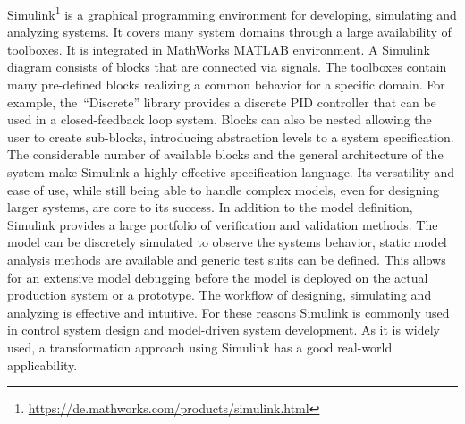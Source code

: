 Simulink\footnote{\url{https://de.mathworks.com/products/simulink.html}} is a graphical programming environment for developing, simulating and analyzing systems.
It covers many system domains through a large availability of toolboxes.
It is integrated in MathWorks MATLAB environment.
A Simulink diagram consists of blocks that are connected via signals.
The toolboxes contain many pre-defined blocks realizing a common behavior for a specific domain.
For example, the~\enquote{Discrete} library provides a discrete PID controller that can be used in a closed-feedback loop system.
Blocks can also be nested allowing the user to create sub-blocks, introducing abstraction levels to a system specification.
The considerable number of available blocks and the general architecture of the system make Simulink a highly effective specification language.
Its versatility and ease of use, while still being able to handle complex models, even for designing larger systems, are core to its success.
In addition to the model definition, Simulink provides a large portfolio of verification and validation methods.
The model can be discretely simulated to observe the systems behavior, static model analysis methods are available and generic test suits can be defined.
This allows for an extensive model debugging before the model is deployed on the actual production system or a prototype.
The workflow of designing, simulating and analyzing is effective and intuitive.
For these reasons Simulink is commonly used in control system design and model-driven system development.
As it is widely used, a transformation approach using Simulink has a good real-world applicability.

